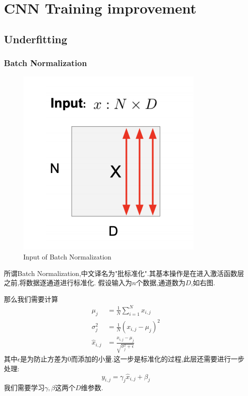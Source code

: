 \section{CNN Training improvement}

\subsection{Underfitting}

\subsubsection{Batch Normalization}

\begin{figure}%
	\includegraphics[scale=0.65]{figures/BNsize.png}
	\caption{Input of Batch Normalization}
	\label{Input of Batch Normalization}
\end{figure}

所谓Batch Normalization,中文译名为"批标准化".其基本操作是在进入激活函数层之前,将数据逐通道进行标准化.
假设输入为$n$个数据,通道数为$D$,如右图.

那么我们需要计算
\begin{equation}
	\begin{split}
		\mu_j &= \frac{1}{N} \sum_{i=1}^{N} x_{i, j}
		\\
		\sigma_j^2 &= \frac{1}{N} (x_{i, j} - \mu_j)^2
		\\
		\hat{x}_{i, j} &= \frac{x_{i, j} - \mu_j}{\sqrt{\sigma_j^2 + \epsilon}}
	\end{split}
	\label{BN calculation}
\end{equation}
其中$\epsilon$是为防止方差为$0$而添加的小量.这一步是标准化的过程,此层还需要进行一步处理:
\begin{equation}
	y_{i, j} = \gamma_{j} \hat{x}_{i,j} + \beta_j
\end{equation}
我们需要学习$\gamma, \beta$这两个$D$维参数.


